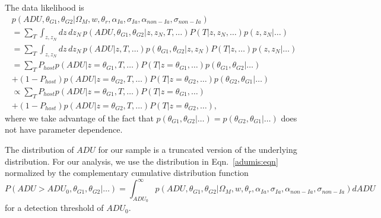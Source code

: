 \documentclass[preprint]{elsarticle}
\begin{document}
The data likelihood is 
\begin{multline}
p(\mathit{ADU}, \theta_{G1}, \theta_{G2} | \Omega_M, w, \theta_r, \alpha_{Ia},\sigma_{Ia}, \alpha_{\mathit{non-Ia}},\sigma_{\mathit{non-Ia}})  \\
= \sum_{T}\int_{z,z_N} dz\,dz_N \, p(\mathit{ADU, \theta_{G1}, \theta_{G2}}| z , z_N, T, \ldots)P(T| z, z_N,\ldots) p(z, z_N|\ldots)\\
 =\sum_{T} \int_{z,z_N} dz\,dz_N\, p(\mathit{ADU}| z ,T, \ldots)p(\theta_{G1}, \theta_{G2}| z , z_N) P(T| z, \ldots) p(z, z_N|\ldots)\\
= \sum_{T} P_{host} p(\mathit{ADU}| z=\theta_{G1} ,T, \ldots) P(T| z=\theta_{G1}, \ldots) p(\theta_{G1},\theta_{G2}|\ldots) \\
 +  (1-P_{host}) p(\mathit{ADU}| z=\theta_{G2} ,T, \ldots) P(T| z=\theta_{G2}, \ldots) p(\theta_{G2},
 \theta_{G1}|\ldots)\\
\propto \sum_{T} P_{host} p(\mathit{ADU}| z=\theta_{G1} ,T, \ldots) P(T| z=\theta_{G1}, \ldots) \\
 +  (1-P_{host}) p(\mathit{ADU}| z=\theta_{G2} ,T, \ldots) P(T| z=\theta_{G2}, \ldots),
\label{adumis:eqn}
\end{multline}
where we take advantage of the fact that
$p(\theta_{G1}, \theta_{G2} | \ldots) = p(\theta_{G2}, \theta_{G1} | \ldots)$ does
not have parameter dependence.

The distribution of $\mathit{ADU}$ for our sample is a truncated version of the
underlying distribution.  
For our analysis, we use the distribution in  Eqn.~\ref{adumis:eqn} normalized by
the complementary cumulative distribution function
\begin{equation}
P(\mathit{ADU}>\mathit{ADU}_0, \theta_{G1}, \theta_{G2}|\ldots) = \int_{\mathit{ADU}_0}^{\infty} p(\mathit{ADU}, \theta_{G1}, \theta_{G2}|\Omega_M, w, \theta_r, \alpha_{Ia},\sigma_{Ia}, \alpha_{\mathit{non-Ia}},\sigma_{\mathit{non-Ia}})d\mathit{ADU}
\end{equation}
for a detection threshold of $\mathit{ADU}_0$.

\end{document}
